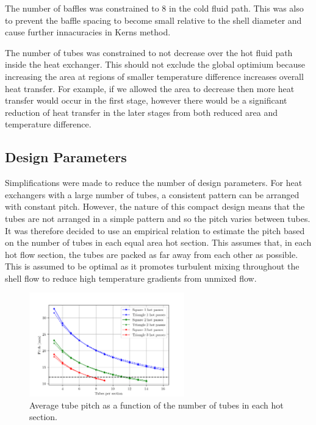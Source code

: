 \documentclass{article}
\begin{document}
The number of baffles was constrained to 8 in the cold fluid path. %
This was also to prevent the baffle spacing to become small relative to the shell diameter and cause further
innacuracies in Kerns method.

The number of tubes was constrained to not decrease over the hot fluid path inside the heat exchanger.
This should not exclude the global optimium because increasing the area at regions of smaller temperature difference increases overall heat transfer.
For example, if we allowed the area to decrease then more heat transfer would occur in the first stage,
however there would be a significant reduction of heat transfer in the later stages from both reduced area and temperature difference.

\subsection{Design Parameters}

Simplifications were made to reduce the number of design parameters.
For heat exchangers with a large number of tubes, a consistent pattern can be arranged with constant pitch.
However, the nature of this compact design means that the tubes are not arranged in a simple pattern and so the pitch varies between tubes.
It was therefore decided to use an empirical relation to estimate the pitch based on the number of tubes in each equal area hot section.
This assumes that, in each hot flow section, the tubes are packed as far away from each other as possible.
This is assumed to be optimal as it promotes turbulent mixing throughout the shell flow to reduce high temperature gradients from unmixed flow.

\begin{figure}[H]
  \centering
  \includegraphics[width=0.6\textwidth]{pitch_vs_tubes.png}
  \caption{Average tube pitch as a function of the number of tubes in each hot section.}
  \label{fig:pitch_vs_tubes}
\end{figure}
\end{document}
